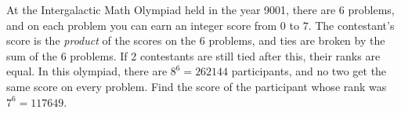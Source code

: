 At the Intergalactic Math Olympiad held in the year 9001, there are 6 problems, and on each problem you can earn an integer score from $0$ to $7$. The contestant's score is the 
\emph{product} of the scores on the 6 problems, and ties are broken by the sum of the 6 problems. If 2 contestants are still tied after this, their ranks are equal. In this olympiad, there are $8^6=262144$ participants, and no two get the same score on every problem. Find the score of the participant whose rank was $7^6 = 117649$.
